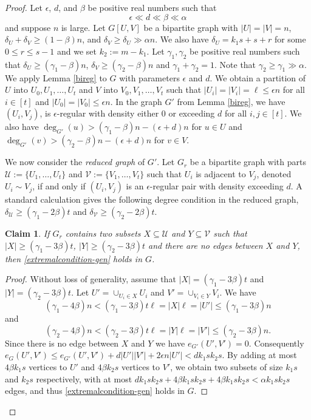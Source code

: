 \documentclass[oneside,12pt]{memoir}
\newtheorem{claim}[theorem]{Claim}
\newcommand{\ep}{\epsilon}
\begin{document}
\begin{proof}Let $\ep$, $d$, and $\beta$ be positive real numbers such that $$\ep\ll d\ll \beta\ll \alpha$$ and suppose $n$ is large.  Let $G[U,V]$ be a bipartite graph with $|U|=|V|=n$,  $\delta_U+\delta_V\geq (1-\beta)n$, and $\delta_V\geq \delta_U\gg \alpha n$.  We also have $\delta_U=k_1s+s+r$ for some $0\leq r\leq s-1$ and we set $k_2:=m-k_1$.  Let $\gamma_1, \gamma_2$ be positive real numbers such that $\delta_U\geq (\gamma_1-\beta)n$, $\delta_V\geq (\gamma_2-\beta) n$ and $\gamma_1+\gamma_2=1$.  Note that $\gamma_2\geq \gamma_1\gg \alpha$.  We apply Lemma \ref{bireg} to $G$ with parameters $\ep$ and $d$.  We obtain a partition of $U$ into $U_0, U_1,\dots, U_t$ and $V$ into $V_0, V_1,\dots, V_t$ such that $|U_i|=|V_i|=\ell\leq \ep n$ for all $i\in [t]$ and $|U_0|=|V_0|\leq \ep n$.  In the graph $G'$ from Lemma \ref{bireg}, we have $(U_i, V_j)$, is $\ep$-regular with density either $0$ or exceeding $d$ for all $i,j\in [t]$.  We also have $\deg_{G'}(u)>(\gamma_1-\beta)n-(\ep+d)n$ for $u\in U$ and $\deg_{G'}(v)>(\gamma_2-\beta)n-(\ep+d)n$ for $v\in V$.

We now consider the \emph{reduced graph} of $G'$.  Let $G_r$ be a bipartite graph with parts $\mathcal{U}:=\{U_1, \dots, U_t\}$ and $\mathcal{V}:=\{V_1,\dots, V_t\}$ such that $U_i$ is adjacent to $V_j$, denoted $U_i\sim V_j$, if and only if $(U_i, V_j)$ is an $\ep$-regular pair with density exceeding $d$.  A standard calculation gives the following degree condition in the reduced graph, $\delta_\mathcal{U}\geq (\gamma_1-2\beta)t$ and $\delta_\mathcal{V}\geq (\gamma_2-2\beta)t$.

\begin{claim}\label{split-gen}
If $G_r$ contains two subsets $X\subseteq \mathcal{U}$ and $Y\subseteq \mathcal{V}$ such that $|X|\geq (\gamma_1-3\beta)t$, $|Y|\geq (\gamma_2-3\beta)t$ and there are no edges between $X$ and $Y$, then \eqref{extremalcondition-gen} holds in $G$.
\end{claim}

\begin{proof}
Without loss of generality, assume that $|X|=(\gamma_1-3\beta)t$ and $|Y|=(\gamma_2-3\beta)t$.  Let $U'=\cup_{U_i\in X}U_i$ and $V'=\cup_{V_i\in Y}V_i$.  We have 
$$(\gamma_1-4\beta)n<(\gamma_1-3\beta)t\ell=|X|\ell=|U'|\leq (\gamma_1-3\beta)n$$
and
$$(\gamma_2-4\beta)n<(\gamma_2-3\beta)t\ell=|Y|\ell=|V'|\leq (\gamma_2-3\beta)n.$$
Since there is no edge between $X$ and $Y$ we have $e_{G'}(U',V')=0$.  Consequently $e_G(U', V')\leq e_{G'}(U', V')+d|U'||V'|+2\ep n|U'|<dk_1sk_2s$.  By adding at most $4\beta k_1s$ vertices to $U'$ and $4\beta k_2s$ vertices to $V'$, we obtain two subsets of size $k_1s$ and $k_2s$ respectively, with at most $dk_1sk_2s+4\beta k_1sk_2s+4\beta k_1sk_2s<\alpha k_1sk_2s$ edges, and thus \eqref{extremalcondition-gen} holds in $G$.
\end{proof}


\end{proof}
\end{document}
